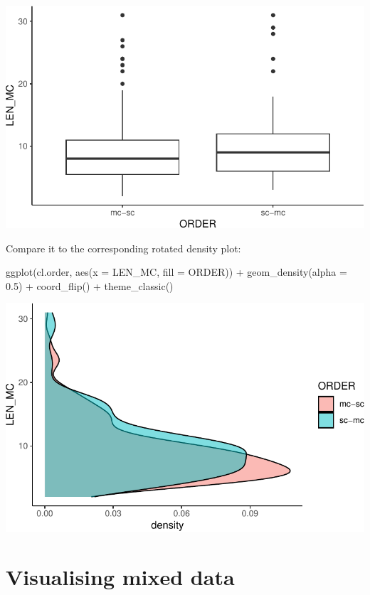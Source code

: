\documentclass[
  11pt,
  letterpaper,
  DIV=11,
  numbers=noendperiod]{scrreprt}
\newenvironment{Shaded}{\begin{snugshade}}{\end{snugshade}}
\newcommand{\AttributeTok}[1]{\textcolor[rgb]{0.40,0.45,0.13}{#1}}
\newcommand{\FloatTok}[1]{\textcolor[rgb]{0.68,0.00,0.00}{#1}}
\newcommand{\FunctionTok}[1]{\textcolor[rgb]{0.28,0.35,0.67}{#1}}
\newcommand{\NormalTok}[1]{\textcolor[rgb]{0.00,0.23,0.31}{#1}}
\newcommand{\SpecialCharTok}[1]{\textcolor[rgb]{0.37,0.37,0.37}{#1}}
\begin{document}
\includegraphics{Summary_statistics_files/figure-pdf/unnamed-chunk-23-1.pdf}

Compare it to the corresponding rotated density plot:

\begin{Shaded}
\begin{Highlighting}[]
\FunctionTok{ggplot}\NormalTok{(cl.order, }\FunctionTok{aes}\NormalTok{(}\AttributeTok{x =}\NormalTok{ LEN\_MC, }\AttributeTok{fill =}\NormalTok{ ORDER)) }\SpecialCharTok{+}
  \FunctionTok{geom\_density}\NormalTok{(}\AttributeTok{alpha =} \FloatTok{0.5}\NormalTok{) }\SpecialCharTok{+}
  \FunctionTok{coord\_flip}\NormalTok{() }\SpecialCharTok{+}
  \FunctionTok{theme\_classic}\NormalTok{()}
\end{Highlighting}
\end{Shaded}

\includegraphics{Summary_statistics_files/figure-pdf/unnamed-chunk-24-1.pdf}

\section{Visualising mixed data}\label{visualising-mixed-data}
\end{document}
